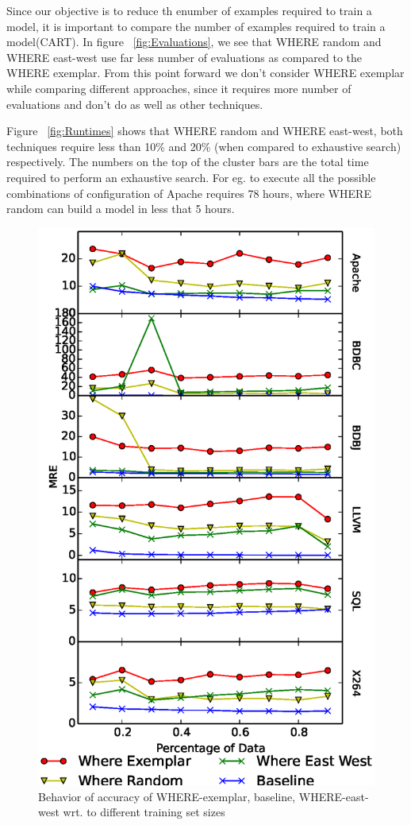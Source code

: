 \documentclass{sig-alternative}
\begin{document}
Since our objective is to reduce th enumber of examples required to train a model, it is important to compare the number of examples required to train a model(CART). In figure ~\ref{fig:Evaluations}, we see that WHERE random and WHERE east-west use far less number of evaluations as compared to the WHERE exemplar. From this point forward we don't consider WHERE exemplar while comparing different approaches, since it requires more number of evaluations and don't do as well as other techniques. 

Figure ~\ref{fig:Runtimes} shows that WHERE random and WHERE east-west, both techniques require less than 10\% and 20\% (when compared to exhaustive search) respectively. The numbers on the top of the cluster bars are the total time required to perform an exhaustive search. For eg. to execute all the possible combinations of configuration of Apache requires 78 hours, where  WHERE random can build a model in less that 5 hours. 

\begin{figure}[!t]
\includegraphics[width=0.9\linewidth]{Figures/SamplingAccuracy.eps}
\caption{Behavior of accuracy of WHERE-exemplar, baseline, WHERE-east-west wrt. to different training set sizes }\label{fig:sampling_accuracy}
\end{figure}
\end{document}
